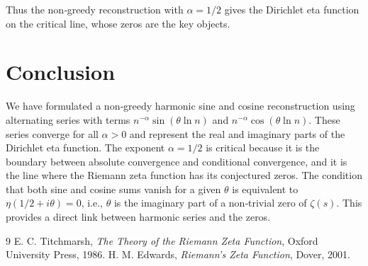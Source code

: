 \documentclass[12pt,a4paper]{article}
\begin{document}
Thus the non‑greedy reconstruction with $\alpha=1/2$ gives the Dirichlet eta function on the critical line, whose zeros are the key objects.

\section{Conclusion}

We have formulated a non‑greedy harmonic sine and cosine reconstruction using alternating series with terms $n^{-\alpha}\sin(\theta\ln n)$ and $n^{-\alpha}\cos(\theta\ln n)$. These series converge for all $\alpha>0$ and represent the real and imaginary parts of the Dirichlet eta function. The exponent $\alpha=1/2$ is critical because it is the boundary between absolute convergence and conditional convergence, and it is the line where the Riemann zeta function has its conjectured zeros. The condition that both sine and cosine sums vanish for a given $\theta$ is equivalent to $\eta(1/2+i\theta)=0$, i.e., $\theta$ is the imaginary part of a non‑trivial zero of $\zeta(s)$. This provides a direct link between harmonic series and the zeros.

\begin{thebibliography}{9}
 E. C. Titchmarsh, \textit{The Theory of the Riemann Zeta Function}, Oxford University Press, 1986.
 H. M. Edwards, \textit{Riemann's Zeta Function}, Dover, 2001.
\end{thebibliography}
\end{document}
